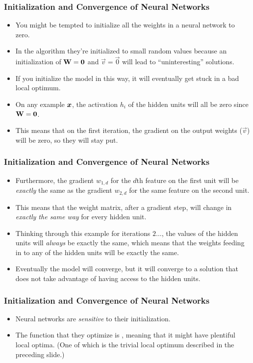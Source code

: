 \documentclass[trans]{beamer}
\begin{document}

\begin{frame}
  \frametitle{Initialization and Convergence of Neural Networks}
\begin{itemize}
\item
You might be tempted to
initialize all the weights in a neural network to zero. 
\item  In the algorithm they're initialized to small random values 
because an initialization of $\text{\bf W} = \text{\bf 0}$ and $\vec
v = \vec 0$ will lead to ``uninteresting'' solutions.  
\item If you initialize the model in this way, it will eventually get stuck
in a bad local optimum.  
\item On any
example ${\boldsymbol{x}}$, the activation $h_i$ of the hidden units will all be
zero since $\text{\bf W} = \text{\bf 0}$. 
\item This means that on the first iteration,
the gradient on the output weights ($\vec v$) will be zero, so they
will stay put. 
\end{itemize}
\end{frame}

\begin{frame}
  \frametitle{Initialization and Convergence of Neural Networks}
\begin{itemize}
\item
Furthermore, the gradient $w_{1,d}$ for the $d$th
feature on the first unit will be \emph{exactly} the same as the
gradient $w_{2,d}$ for the same feature on the second unit.  
\item This
means that the weight matrix, after a gradient step, will change in
\emph{exactly the same way} for every hidden unit.  
\item Thinking through
this example for iterations $2\dots$, the values of the hidden units
will \emph{always} be exactly the same, which means that the weights
feeding in to any of the hidden units will be exactly the same.
\item
Eventually the model will converge, but it will converge to a solution
that does not take advantage of having access to the hidden units.
\end{itemize}
\end{frame}

\begin{frame}
  \frametitle{Initialization and Convergence of Neural Networks}
\begin{itemize}
\item
Neural networks are \emph{sensitive} to their
initialization.
\item The function that they optimize is
, meaning that it might have plentiful local
optima.  (One of which is the trivial local optimum described in the
preceding slide.)  
\end{itemize}
\end{frame}
\end{document}
